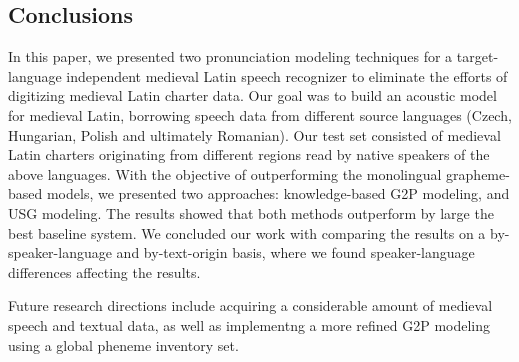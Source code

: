 \documentclass[runningheads,a4paper]{llncs}
\begin{document}
\subsection{Conclusions}
In this paper, we presented two pronunciation modeling techniques for a target-language independent medieval Latin speech recognizer to eliminate the efforts of digitizing medieval Latin charter data.
Our goal was to build an acoustic model for medieval Latin, borrowing speech data from different source languages (Czech, Hungarian, Polish and ultimately Romanian).
Our test set consisted of medieval Latin charters originating from different regions read by native speakers of the above languages.
With the objective of outperforming the monolingual grapheme-based models, we presented two approaches: knowledge-based G2P modeling, and USG modeling.
The results showed that both methods outperform by large the best baseline system. 
We concluded our work with comparing the results on a by-speaker-language and by-text-origin basis, where we found speaker-language differences affecting the results.

Future research directions include acquiring a considerable amount of medieval speech and textual data, as well as implementng a more refined G2P modeling using a global pheneme inventory set.



\end{document}
